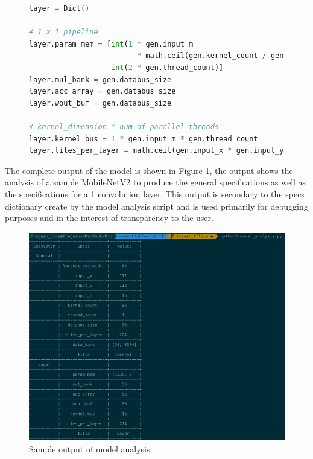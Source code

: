 \documentclass{uw-ece-wkrpt}
\begin{document}
\begin{figure}
\centering
\begin{lstlisting}[caption={Code for generating general specifications}, label=lst:general_specs, language=Python]
layer = Dict()

# 1 x 1 pipeline
layer.param_mem = [int(1 * gen.input_m
                         * math.ceil(gen.kernel_count / gen.thread_count)),
                   int(2 * gen.thread_count)]
layer.mul_bank = gen.databus_size
layer.acc_array = gen.databus_size
layer.wout_buf = gen.databus_size

# kernel_dimension * num of parallel threads
layer.kernel_bus = 1 * gen.input_m * gen.thread_count
layer.tiles_per_layer = math.ceil(gen.input_x * gen.input_y / gen.databus_size)
\end{lstlisting}
\end{figure}

The complete output of the model is shown in Figure \ref{fig:model_analysis_output}, the output shows the analysis of a sample MobileNetV2 to produce the general specifications as well as the specifications for a 1  convolution layer. This output is secondary to the specs dictionary create by the model analysis script and is used primarily for debugging purposes and in the interest of transparency to the user.

\begin{figure}
\centering
\includegraphics[width=\textwidth]{figures/model_analysis_output}
\caption{Sample output of model analysis}\label{fig:model_analysis_output}
\end{figure}
\end{document}
